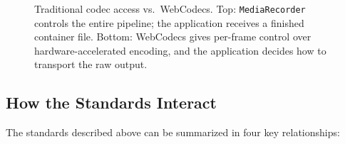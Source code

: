 \documentclass[11pt]{article}
\begin{document}
\begin{figure}[ht]
\caption{Traditional codec access vs.\ WebCodecs.  Top: \texttt{MediaRecorder}
  controls the entire pipeline; the application receives a finished container
  file.  Bottom: WebCodecs gives per-frame control over hardware-accelerated
  encoding, and the application decides how to transport the raw output.}
\label{fig:webcodecs-pipeline}
\end{figure}

\subsection{How the Standards Interact}

The standards described above can be summarized in four key relationships:
\end{document}
